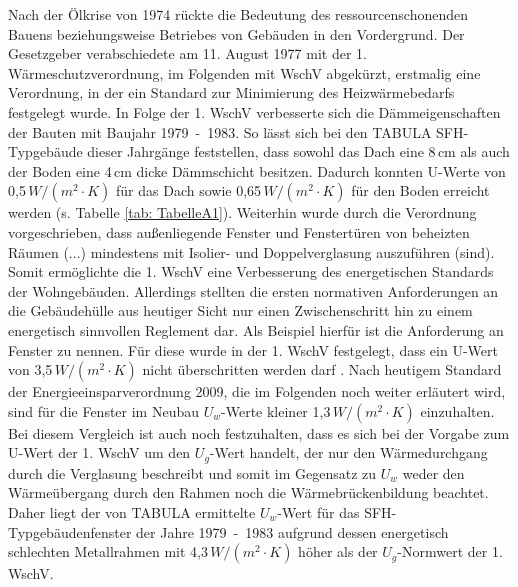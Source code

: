 Nach der Ölkrise von 1974 rückte die Bedeutung des ressourcenschonenden Bauens beziehungsweise Betriebes von Gebäuden in den Vordergrund. 
Der Gesetzgeber verabschiedete am 11. August 1977 mit der 1. Wärmeschutzverordnung, im Folgenden mit WschV abgekürzt, erstmalig eine Verordnung, in der ein Standard zur Minimierung des Heizwärmebedarfs festgelegt wurde. 
In Folge der 1. WschV verbesserte sich die Dämmeigenschaften der Bauten mit Baujahr \mbox{1979 - 1983}.
So lässt sich bei den TABULA SFH-Typgebäude dieser Jahrgänge feststellen, dass sowohl das Dach eine 8\,cm als auch der Boden eine 4\,cm dicke Dämmschicht besitzen. 
Dadurch konnten U-Werte von 0,5\,\(W/(m^2 \cdot K) \) für das Dach sowie 0,65\,\(W/(m^2 \cdot K) \) für den Boden erreicht werden (s. Tabelle \ref{tab: TabelleA1}).
Weiterhin wurde durch die Verordnung vorgeschrieben, dass \glqq außenliegende Fenster und Fenstertüren von beheizten Räumen (...) mindestens mit Isolier- und Doppelverglasung auszuführen (sind)\grqq \cite{Bundesregierung.1977}.
Somit ermöglichte die 1. WschV eine Verbesserung des energetischen Standards der Wohngebäuden. 
Allerdings stellten die ersten normativen Anforderungen an die Gebäudehülle aus heutiger Sicht nur einen Zwischenschritt hin zu einem energetisch sinnvollen Reglement dar.
Als Beispiel hierfür ist die Anforderung an Fenster zu nennen. 
Für diese wurde in der 1. WschV festgelegt, dass ein U-Wert von 3,5\,\(W/(m^2 \cdot K) \) nicht überschritten werden darf \cite{Bundesregierung.1977}.
Nach heutigem Standard der Energieeinsparverordnung 2009, die im Folgenden noch weiter erläutert wird, sind für die Fenster im Neubau \(U_w\)-Werte kleiner 1,3\,\(W/(m^2 \cdot K) \) einzuhalten.
Bei diesem Vergleich ist auch noch festzuhalten, dass es sich bei der Vorgabe zum U-Wert der 1. WschV um den \(U_g\)-Wert handelt, der nur den Wärmedurchgang durch die Verglasung beschreibt und somit im Gegensatz zu \(U_w\) weder den Wärmeübergang durch den Rahmen noch die Wärmebrückenbildung beachtet. 
Daher liegt der von TABULA ermittelte \(U_w\)-Wert für das SFH-Typgebäudenfenster der Jahre \mbox{1979 - 1983} aufgrund dessen energetisch schlechten Metallrahmen mit 4,3\,\(W/(m^2 \cdot K) \) höher als der \(U_g\)-Normwert der 1. WschV. \cite{EickeHenning.2011} 

